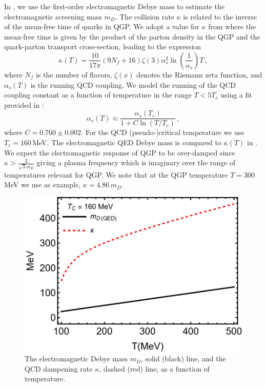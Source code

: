 In \cite{Grayson:2022asf}, we use the first-order electromagnetic Debye mass  to estimate the electromagnetic screening mass $m_D$. The collision rate $\kappa$ is related to the inverse of the mean-free time of quarks in QGP. We adopt a value for $\kappa$ from \cite{Mrowczynski:1988xu} where the mean-free time is given by the product of the parton density in the QGP and the quark-parton transport cross-section, leading to the expression 
\begin{equation}\label{eq:kappadef}
    \kappa(T) = \frac{10}{17\pi} (9 N_f +16) \zeta(3) \alpha_s^2 \ln\left(\frac{1}{\alpha_s}\right) T\,,
\end{equation}
where $N_f$ is the number of flavors, $\zeta(x)$ denotes the Riemann zeta function, and $\alpha_s(T)$ is the running QCD coupling.  We model the running of the QCD coupling constant as a function of temperature in the range $T<5T_c$ using a fit provided in \cite{Letessier:2002ony}:
\begin{equation}\label{eq:alphas}
    \alpha_s(T) \approx \frac{\alpha_s(T_c)}{1+C \ln(T/T_c)}\,,
\end{equation}
where $C=0.760 \pm 0.002$. For the QCD (pseudo-)critical temperature we use $T_c = 160\,$MeV. The  electromagnetic QED Debye mass is compared to $\kappa(T)$ in . We  expect the electromagnetic response of QGP to be over-damped since $\kappa> \frac{2}{\sqrt{3} m_D}$ giving a plasma frequency  which is imaginary over the range of temperatures relevant for QGP. We note that at the QGP temperature $T=300\,$MeV we use as example, $\kappa = 4.86\, m_D$.    

\begin{figure}%
    \centering
    \includegraphics[width=0.85\linewidth]{plots/kappaDEBYE.png}
    \caption{The electromagnetic Debye mass $m_D$, solid (black) line, and the QCD dampening rate $\kappa$, dashed (red) line, as a function of temperature.  }
    \label{fig:kappaDebye}
\end{figure}



